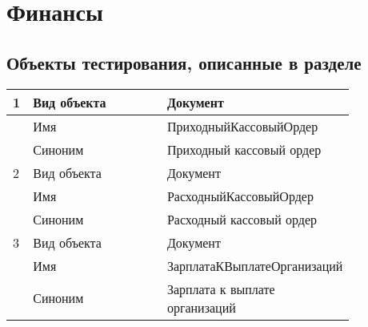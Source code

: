 \section{Финансы}
\subsection{Объекты тестирования, описанные в разделе}

\begin{longtable}{p{0.05\linewidth}p{0.4\linewidth}p{0.4\linewidth}}
    \hline
    1 & Вид объекта & Документ \\
    \hline
    & Имя & ПриходныйКассовыйОрдер \\
    \hline
    & Синоним  & Приходный кассовый ордер \\
    \hline
    2 & Вид объекта  & Документ \\
    \hline
    & Имя & РасходныйКассовыйОрдер \\
    \hline
    & Синоним  & Расходный кассовый ордер \\
    \hline
    3 & Вид объекта  & Документ \\
    \hline
    & Имя & ЗарплатаКВыплатеОрганизаций \\
    \hline
    & Синоним  & Зарплата к выплате организаций \\
    \hline

    \bottomrule %
\end{longtable}